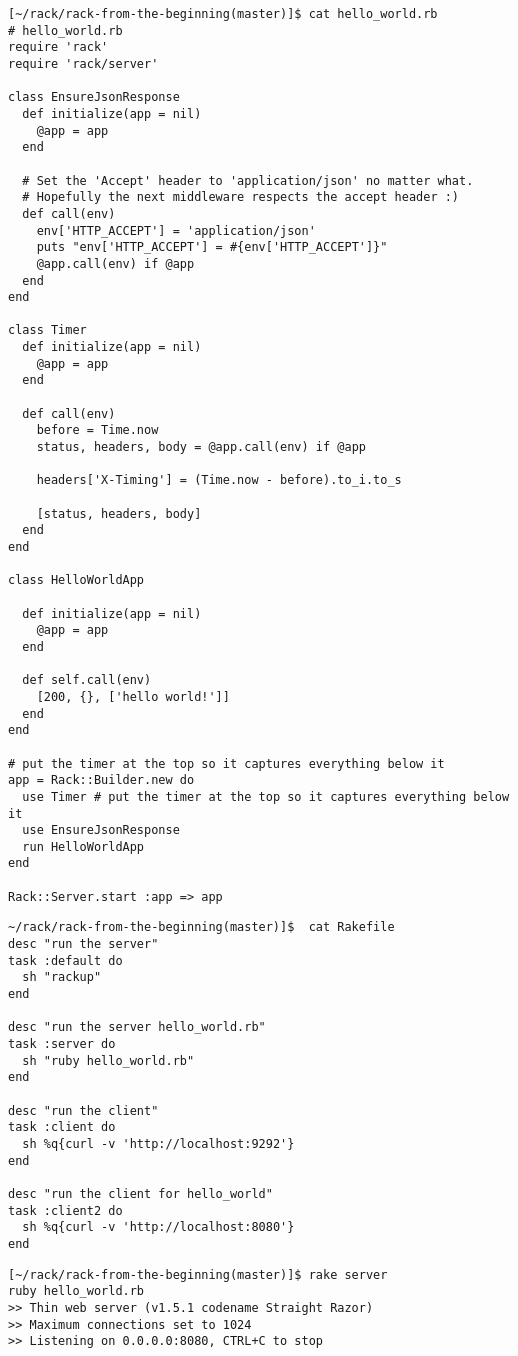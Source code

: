 \begin{verbatim}
[~/rack/rack-from-the-beginning(master)]$ cat hello_world.rb 
# hello_world.rb
require 'rack'
require 'rack/server'

class EnsureJsonResponse
  def initialize(app = nil)
    @app = app
  end

  # Set the 'Accept' header to 'application/json' no matter what.
  # Hopefully the next middleware respects the accept header :)
  def call(env)
    env['HTTP_ACCEPT'] = 'application/json'
    puts "env['HTTP_ACCEPT'] = #{env['HTTP_ACCEPT']}"
    @app.call(env) if @app
  end
end

class Timer
  def initialize(app = nil)
    @app = app
  end

  def call(env)
    before = Time.now
    status, headers, body = @app.call(env) if @app

    headers['X-Timing'] = (Time.now - before).to_i.to_s

    [status, headers, body]
  end
end

class HelloWorldApp

  def initialize(app = nil)
    @app = app
  end

  def self.call(env)
    [200, {}, ['hello world!']] 
  end
end

# put the timer at the top so it captures everything below it
app = Rack::Builder.new do 
  use Timer # put the timer at the top so it captures everything below it
  use EnsureJsonResponse
  run HelloWorldApp
end

Rack::Server.start :app => app
\end{verbatim}

\begin{verbatim}
~/rack/rack-from-the-beginning(master)]$  cat Rakefile 
desc "run the server"
task :default do
  sh "rackup"
end

desc "run the server hello_world.rb"
task :server do
  sh "ruby hello_world.rb"
end

desc "run the client"
task :client do
  sh %q{curl -v 'http://localhost:9292'}
end

desc "run the client for hello_world"
task :client2 do
  sh %q{curl -v 'http://localhost:8080'}
end
\end{verbatim}

\begin{verbatim}
[~/rack/rack-from-the-beginning(master)]$ rake server
ruby hello_world.rb
>> Thin web server (v1.5.1 codename Straight Razor)
>> Maximum connections set to 1024
>> Listening on 0.0.0.0:8080, CTRL+C to stop
\end{verbatim}


